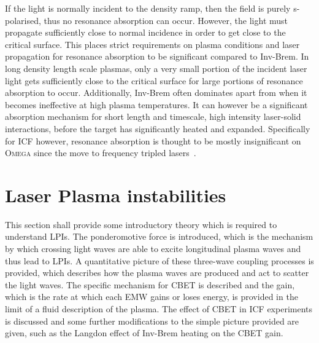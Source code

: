 If the light is normally incident to the density ramp, then the field is purely s-polarised, thus no resonance absorption can occur.
However, the light must propagate sufficiently close to normal incidence in order to get close to the critical surface.
This places strict requirements on plasma conditions and laser propagation for resonance absorption to be significant compared to \ac{Inv-Brem}.
In long density length scale plasmas, only a very small portion of the incident laser light gets sufficiently close to the critical surface for large portions of resonance absorption to occur.
Additionally, \ac{Inv-Brem} often dominates apart from when it becomes ineffective at high plasma temperatures.
It can however be a significant absorption mechanism for short length and timescale, high intensity laser-solid interactions, before the target has significantly heated and expanded.
Specifically for \ac{ICF} however, resonance absorption is thought to be mostly insignificant on \textsc{Omega} since the move to frequency tripled lasers~\cite{craxton_directdrive_2015}.

\section{Laser Plasma instabilities}%
\label{sec:theory_LPIs}

This section shall provide some introductory theory which is required to understand \ac{LPIs}.
The ponderomotive force is introduced, which is the mechanism by which crossing light waves are able to excite longitudinal plasma waves and thus lead to \ac{LPIs}.
A quantitative picture of these three-wave coupling processes is provided, which describes how the plasma waves are produced and act to scatter the light waves.
The specific mechanism for \ac{CBET} is described and the gain, which is the rate at which each \ac{EMW} gains or loses energy, is provided in the limit of a fluid description of the plasma.
The effect of \ac{CBET} in \ac{ICF} experiments is discussed and some further modifications to the simple picture provided are given, such as the Langdon effect of \ac{Inv-Brem} heating on the \ac{CBET} gain.

